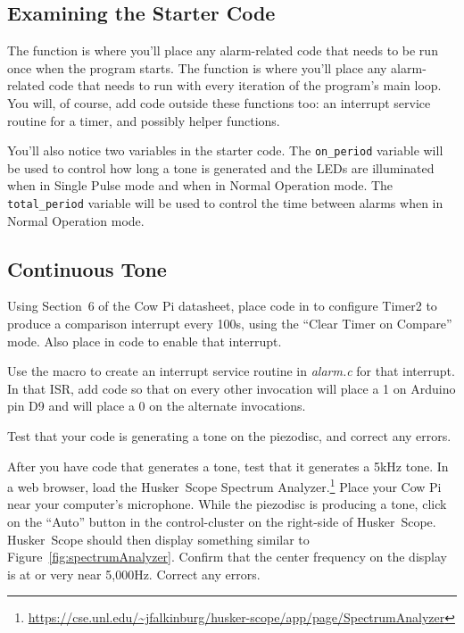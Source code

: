 \subsection{Examining the Starter Code}

The  function is where you'll place any alarm-related code that needs to be run once when the program starts.
The  function is where you'll place any alarm-related code that needs to run with every iteration of the program's main loop.
You will, of course, add code outside these functions too: an interrupt service routine for a timer, and possibly helper functions.

You'll also notice two variables in the starter code.
The \lstinline{on_period} variable will be used to control how long a tone is generated and the LEDs are illuminated when in Single Pulse mode and when in Normal Operation mode.
The \lstinline{total_period} variable will be used to control the time between alarms when in Normal Operation mode.

\subsection{Continuous Tone}

Using Section~6 of the Cow Pi datasheet, place code in  to configure Timer2 to produce a comparison interrupt every 100\textmu s, using the ``Clear Timer on Compare'' mode.
Also place in  code to enable that interrupt.

Use the  macro to create an interrupt service routine in \textit{alarm.c} for that interrupt.
In that ISR, add code so that on every other invocation will place a 1 on Arduino pin D9 and will place a 0 on the alternate invocations.

Test that your code is generating a tone on the piezodisc, and correct any errors.

After you have code that generates a tone, test that it generates a 5kHz tone.
In a web browser, load the Husker~Scope Spectrum Analyzer.\footnote{
    \url{https://cse.unl.edu/~jfalkinburg/husker-scope/app/page/SpectrumAnalyzer}
}
Place your Cow Pi near your computer's microphone.
While the piezodisc is producing a tone, click on the ``Auto'' button in the control-cluster on the right-side of Husker~Scope.
Husker~Scope should then display something similar to Figure~\ref{fig:spectrumAnalyzer}.
Confirm that the center frequency on the display is at or very near 5,000Hz.
Correct any errors.


